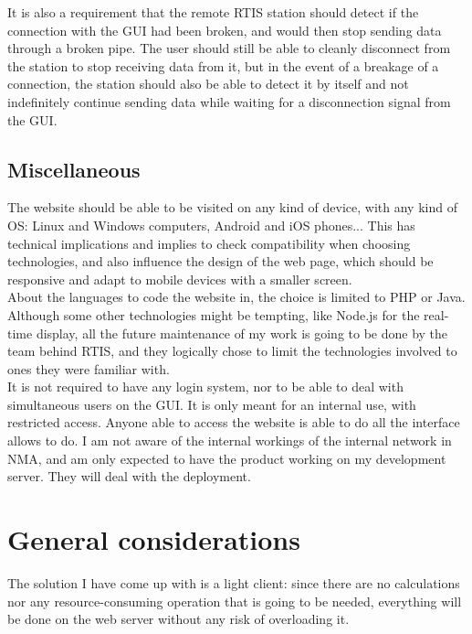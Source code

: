 \documentclass{themeensg}
\begin{document}
It is also a requirement that the remote RTIS station should detect if the connection with the GUI had been broken, and would then stop sending data through a broken pipe. The user should still be able to cleanly disconnect from the station to stop receiving data from it, but in the event of a breakage of a connection, the station should also be able to detect it by itself and not indefinitely continue sending data while waiting for a disconnection signal from the GUI.

\subsection{Miscellaneous}
The website should be able to be visited on any kind of device, with any kind of OS: Linux and Windows computers, Android and iOS phones... This has technical implications and implies to check compatibility when choosing technologies, and also influence the design of the web page, which should be responsive and adapt to mobile devices with a smaller screen.\\

About the languages to code the website in, the choice is limited to PHP or Java. Although some other  technologies might be tempting, like Node.js for the real-time display, all the future maintenance of my work is going to be done by the team behind RTIS, and they logically chose to limit the technologies involved to ones they were familiar with.\\

It is not required to have any login system, nor to be able to deal with simultaneous users on the GUI. It is only meant for an internal use, with restricted access. Anyone able to access the website is able to do all the interface allows to do. I am not aware of the internal workings of the internal network in NMA, and am only expected to have the product working on my development server. They will deal with the deployment.

\section{General considerations}

The solution I have come up with is a light client: since there are no calculations nor any resource-consuming operation that is going to be needed, everything will be done on the web server without any risk of overloading it.\\
\end{document}
